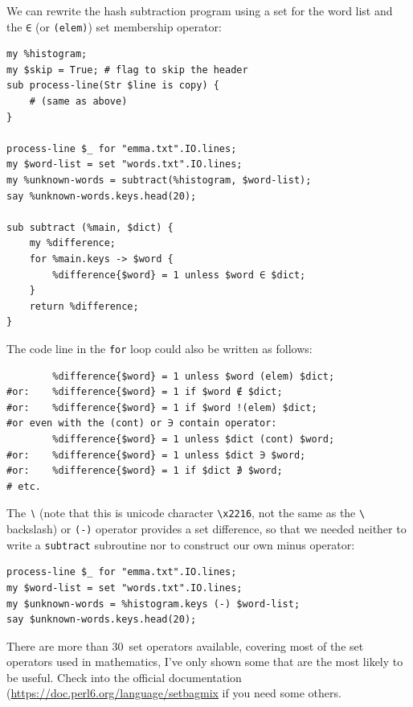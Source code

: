 We can rewrite the hash subtraction program using a set for 
the word list and the  \verb'∈' (or \verb'(elem)') 
set membership operator:

\begin{verbatim}
my %histogram;
my $skip = True; # flag to skip the header
sub process-line(Str $line is copy) {
    # (same as above)
}

process-line $_ for "emma.txt".IO.lines; 
my $word-list = set "words.txt".IO.lines;
my %unknown-words = subtract(%histogram, $word-list);
say %unknown-words.keys.head(20);

sub subtract (%main, $dict) {
	my %difference;
	for %main.keys -> $word {
		%difference{$word} = 1 unless $word ∈ $dict;
	}
	return %difference;
}
\end{verbatim}

The code line in the {\tt for} loop could also be written as follows:

\begin{verbatim}
        %difference{$word} = 1 unless $word (elem) $dict;
#or:    %difference{$word} = 1 if $word ∉ $dict;
#or:    %difference{$word} = 1 if $word !(elem) $dict;
#or even with the (cont) or ∋ contain operator:
        %difference{$word} = 1 unless $dict (cont) $word;
#or:    %difference{$word} = 1 unless $dict ∋ $word;
#or:    %difference{$word} = 1 if $dict ∌ $word;
# etc.
\end{verbatim}

The \verb'∖' (note that this is unicode character \verb'\x2216', 
not the same as the \verb'\' backslash) or \verb'(-)' operator 
provides a set difference, so that we needed neither to write a 
{\tt subtract} subroutine nor to construct our own minus operator:

\begin{verbatim}
process-line $_ for "emma.txt".IO.lines; 
my $word-list = set "words.txt".IO.lines;
my $unknown-words = %histogram.keys (-) $word-list;
say $unknown-words.keys.head(20);
\end{verbatim}

There are more than 30~set operators available, covering most of 
the set operators used in mathematics, I've only shown 
some that are the most likely to be useful. Check into the 
official documentation (\url{https://doc.perl6.org/language/setbagmix} 
if you need some others.

